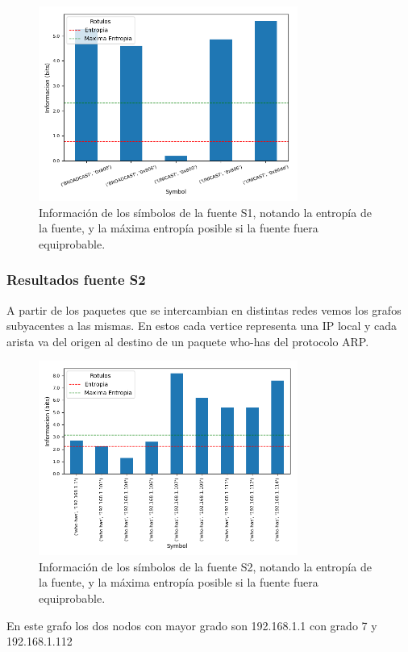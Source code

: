 \begin{figure}[H]
  \centering
  \includegraphics[width=8.5cm]{figs/information_hogar_ethernet_S1_output.png}
  \caption{\normalfont Información de los símbolos de la fuente S1, notando la entropía de la fuente, y la máxima entropía posible si la fuente fuera equiprobable.}
\end{figure}

\subsubsection*{Resultados fuente S2}

A partir de los paquetes que se intercambian en distintas redes vemos los grafos subyacentes a las mismas. En estos cada vertice representa una IP local y cada arista va del origen al destino de un paquete who-has del protocolo ARP.

\begin{figure}[H]
  \centering
  \includegraphics[width=8.5cm]{figs/information_hogar_ethernet_S2_output.png}
  \caption{\normalfont Información de los símbolos de la fuente S2, notando la entropía de la fuente, y la máxima entropía posible si la fuente fuera equiprobable.}
\end{figure}

En este grafo los dos nodos con mayor grado son 192.168.1.1 con grado 7 y 192.168.1.112


